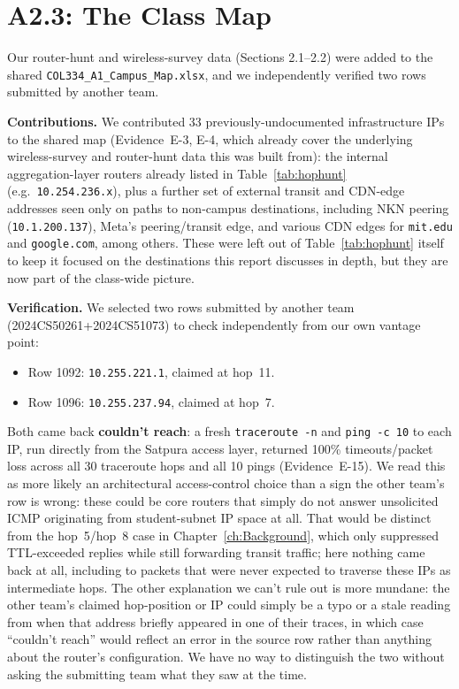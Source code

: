 \section{A2.3: The Class Map}
Our router-hunt and wireless-survey data (Sections 2.1--2.2) were added to the shared
\texttt{COL334\_A1\_Campus\_Map.xlsx}, and we independently verified two rows submitted by
another team.

\textbf{Contributions.} We contributed 33 previously-undocumented infrastructure IPs to the
shared map (Evidence~E-3, E-4, which already cover the underlying wireless-survey and
router-hunt data this was built from): the internal aggregation-layer routers already listed in
Table~\ref{tab:hophunt} (e.g.\ \texttt{10.254.236.x}), plus a further set of external transit and
CDN-edge addresses seen only on paths to non-campus destinations, including NKN peering
(\texttt{10.1.200.137}), Meta's peering/transit edge, and various CDN edges for
\texttt{mit.edu} and \texttt{google.com}, among others. These were left out of Table~\ref{tab:hophunt}
itself to keep it focused on the destinations this report discusses in depth, but they are now
part of the class-wide picture.

\textbf{Verification.} We selected two rows submitted by another team
(2024CS50261+2024CS51073) to check independently from our own vantage point:

\begin{itemize}
    \item Row 1092: \texttt{10.255.221.1}, claimed at hop~11.
    \item Row 1096: \texttt{10.255.237.94}, claimed at hop~7.
\end{itemize}

Both came back \textbf{couldn't reach}: a fresh \texttt{traceroute -n} and \texttt{ping -c 10} to
each IP, run directly from the Satpura access layer, returned 100\% timeouts/packet loss across
all 30 traceroute hops and all 10 pings (Evidence~E-15). We read this as more likely an
architectural access-control choice than a sign the other team's row is wrong: these could be
core routers that simply do not answer unsolicited ICMP originating from student-subnet IP space
at all. That would be distinct from the hop~5/hop~8 case in Chapter~\ref{ch:Background}, which
only suppressed TTL-exceeded replies while still forwarding transit traffic; here nothing came
back at all, including to packets that were never expected to traverse these IPs as intermediate
hops. The other explanation we can't rule out is more mundane: the other team's claimed
hop-position or IP could simply be a typo or a stale reading from when that address briefly
appeared in one of their traces, in which case ``couldn't reach'' would reflect an error in the
source row rather than anything about the router's configuration. We have no way to distinguish
the two without asking the submitting team what they saw at the time.
